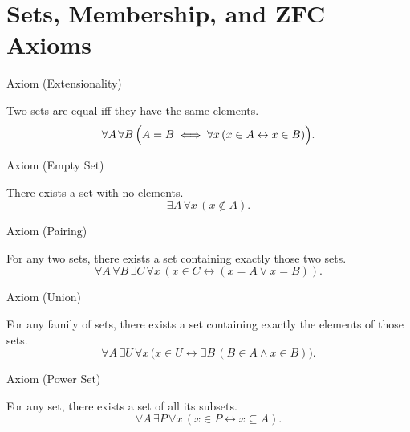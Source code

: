 
\section{Sets, Membership, and ZFC Axioms}

\begin{axiombox}{Axiom (Extensionality)}
\begin{axiom}
\label{ax:extensionality}
Two sets are equal iff they have the same elements.
\[
\forall A \, \forall B \,
\Bigl( A = B \iff \forall x \, (x \in A \leftrightarrow x \in B) \Bigr).
\]
\end{axiom}
\end{axiombox}

\NoLocalDependencies

\begin{axiombox}{Axiom (Empty Set)}
\begin{axiom}
\label{ax:empty-set}
There exists a set with no elements.
\[
\exists A \, \forall x \, (x \notin A).
\]
\end{axiom}
\end{axiombox}

\NoLocalDependencies

\begin{axiombox}{Axiom (Pairing)}
\begin{axiom}
\label{ax:pairing}
For any two sets, there exists a set containing exactly those two sets.
\[
\forall A \, \forall B \, \exists C \,
\forall x \, (x \in C \leftrightarrow (x = A \lor x = B)).
\]
\end{axiom}
\end{axiombox}

\NoLocalDependencies

\begin{axiombox}{Axiom (Union)}
\begin{axiom}
\label{ax:union}
For any family of sets, there exists a set containing exactly the elements of
those sets.
\[
\forall A \, \exists U \,
\forall x \,
\bigl( x \in U \leftrightarrow \exists B \, (B \in A \land x \in B) \bigr).
\]
\end{axiom}
\end{axiombox}

\NoLocalDependencies

\begin{axiombox}{Axiom (Power Set)}
\begin{axiom}
\label{ax:power-set}
For any set, there exists a set of all its subsets.
\[
\forall A \, \exists P \,
\forall x \, (x \in P \leftrightarrow x \subseteq A).
\]
\end{axiom}
\end{axiombox}

